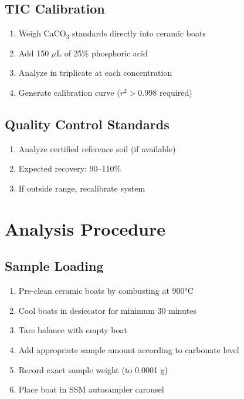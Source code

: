 \documentclass[11pt,a4paper]{article}\usepackage[]{graphicx}\usepackage[]{xcolor}
\begin{document}
\subsection{TIC Calibration}
\begin{enumerate}[noitemsep]
    \item Weigh CaCO$_3$ standards directly into ceramic boats
    \item Add 150 $\mu$L of 25\% phosphoric acid
    \item Analyze in triplicate at each concentration
    \item Generate calibration curve ($r^2 > 0.998$ required)
\end{enumerate}

\subsection{Quality Control Standards}
\begin{enumerate}[noitemsep]
    \item Analyze certified reference soil (if available)
    \item Expected recovery: 90--110\%
    \item If outside range, recalibrate system
\end{enumerate}

\section{Analysis Procedure}

\subsection{Sample Loading}
\begin{enumerate}[noitemsep]
    \item Pre-clean ceramic boats by combusting at 900°C
    \item Cool boats in desiccator for minimum 30 minutes
    \item Tare balance with empty boat
    \item Add appropriate sample amount according to carbonate level
    \item Record exact sample weight (to 0.0001 g)
    \item Place boat in SSM autosampler carousel
\end{enumerate}
\end{document}
